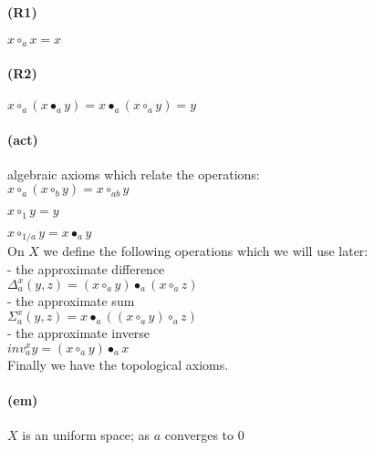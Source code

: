 \documentclass{article}
\begin{document}
\paragraph{(R1)} $\displaystyle x \circ_a x = x$ 
 
\paragraph{(R2)} $\displaystyle x \circ_a (x \bullet_a y) = x \bullet_a (x \circ_a y) = y$ \\
   


\paragraph{(act)} algebraic axioms which relate the operations: \\

      $\displaystyle x \circ_a ( x \circ_b y) = x \circ_{ab} y $
      
      $\displaystyle x \circ_1 y = y $
      
      $\displaystyle x \circ_{1/a} y = x \bullet_a y $\\


\noindent On $X$ we define the following operations which we will use later:\\ 

- the approximate difference \\  

$\displaystyle \Delta^{x}_{a} (y , z)  =  (x \circ_a y) \bullet_a (x \circ_a z) $\\ 

- the approximate sum \\  

$\displaystyle \Sigma^{x}_{a} (y, z) = x \bullet_{a} ( ( x \circ_{a} y) \circ_{a} z)$  \\ 

- the approximate inverse \\

$\displaystyle inv^{x}_{a} y = (x \circ_{a} y) \bullet_{a} x$ \\

\noindent Finally we have the topological axioms. 


\paragraph{(em)} $X$ is an uniform space; as $a$ converges to $0$ \\
\end{document}
